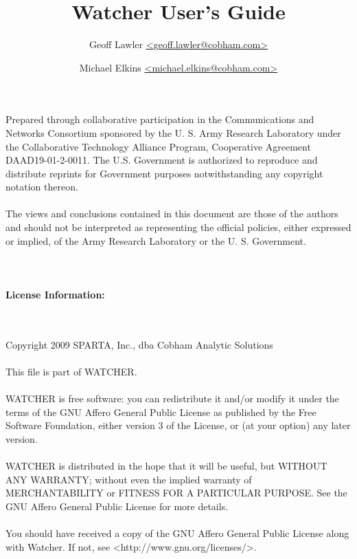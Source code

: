 \documentclass{article}
\begin{document}
\pagestyle{empty}
\title{Watcher User's Guide}
\author{Geoff Lawler \url{<geoff.lawler@cobham.com>} \and {Michael Elkins \url{<michael.elkins@cobham.com>}}}
\maketitle
\thispagestyle{empty}
\newpage
Prepared through collaborative participation in the Communications and Networks Consortium sponsored by the U. S. Army Research Laboratory under the Collaborative Technology Alliance Program, Cooperative Agreement DAAD19-01-2-0011. The U.S. Government is authorized to reproduce and distribute reprints for Government purposes notwithstanding any copyright notation thereon.  
\\\\
The views and conclusions contained in this document are those of the authors and should not be interpreted as representing the official policies, either expressed or implied, of the Army Research Laboratory or the U. S. Government.
\\\\
\\\\
{\bf License Information:}\\
\\\\
\begin{tt}
Copyright 2009 SPARTA, Inc., dba Cobham Analytic Solutions
\\\\
This file is part of WATCHER.
\\\\
WATCHER is free software: you can redistribute it and/or modify it under the terms of the GNU Affero General Public License as published by the Free Software Foundation, either version 3 of the License, or (at your option) any later version.
\\\\
WATCHER is distributed in the hope that it will be useful, but WITHOUT ANY WARRANTY; without even the implied warranty of MERCHANTABILITY or FITNESS FOR A PARTICULAR PURPOSE.  See the GNU Affero General Public License for more details.
\\\\
You should have received a copy of the GNU Affero General Public License along with Watcher.  If not, see <http://www.gnu.org/licenses/>.
\end{tt}
\thispagestyle{empty}
\newpage 
\setcounter{tocdepth}{3}
\tableofcontents
\thispagestyle{empty}
\newpage 
\pagestyle{headings}
\end{document}
